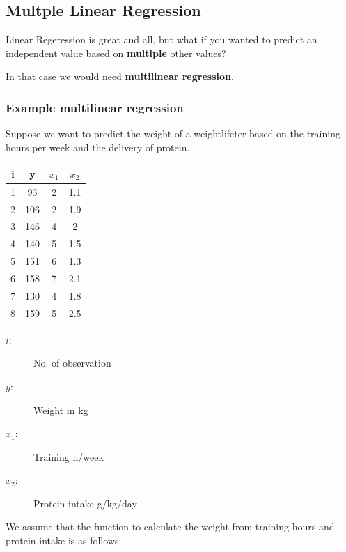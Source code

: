 \documentclass[a4paper, 11pt]{article}
\renewcommand*{\thead}[1]{\bfseries #1}
\begin{document}
\subsection{Multple Linear Regression}

Linear Regeression is great and all, but what if you wanted to predict an independent value based on \textbf{multiple} other values? 

In that case we would need \textbf{multilinear regression}. 

\subsubsection{Example multilinear regression}

Suppose we want to predict the weight of a weightlifeter based on the training hours per week and the delivery of protein.

\vspace{10px}

\begin{minipage}{0.25\textwidth}
    \begin{tabular}{cccc}
        \toprule
        \thead{i} & \thead{y} & \thead{$x_1$} & \thead{$x_2$} \\
        \hline
        1 & 93 & 2 & 1.1 \\
        \hline
        2 & 106 & 2 & 1.9 \\
        \hline
        3 & 146 & 4 & 2 \\
        \hline
        4 & 140 & 5 & 1.5  \\
        \hline
        5 & 151 & 6 & 1.3 \\
        \hline
        6 & 158 & 7 & 2.1 \\
        \hline
        7 & 130 & 4 & 1.8 \\
        \hline
        8 & 159 & 5 & 2.5 \\
        \bottomrule
    \end{tabular}
\end{minipage}\hfill
\begin{minipage}{0.75\textwidth}
    \begin{description}
        \item[$i$: ] No. of observation
        \item[$y$: ] Weight in kg
        \item[$x_1$: ] Training h/week
        \item[$x_2$: ] Protein intake g/kg/day
    \end{description}

    We assume that the function to calculate the weight from training-hours and protein intake is as follows:
\end{minipage}
\end{document}
